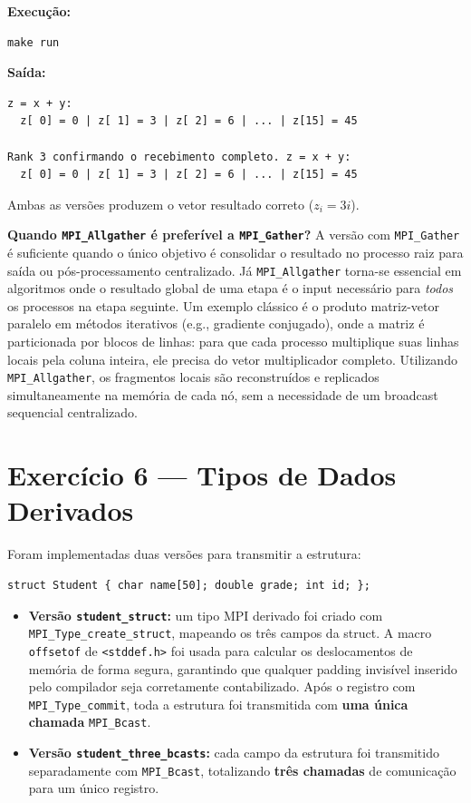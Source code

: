 \documentclass[12pt,a4paper]{article}
\begin{document}
\textbf{Execução:}
\begin{lstlisting}[style=shell]
make run
\end{lstlisting}

\textbf{Saída:}
\begin{lstlisting}[style=shell]
z = x + y:
  z[ 0] = 0 | z[ 1] = 3 | z[ 2] = 6 | ... | z[15] = 45

Rank 3 confirmando o recebimento completo. z = x + y:
  z[ 0] = 0 | z[ 1] = 3 | z[ 2] = 6 | ... | z[15] = 45
\end{lstlisting}

Ambas as versões produzem o vetor resultado correto ($z_i = 3i$).

\textbf{Quando \texttt{MPI\_Allgather} é preferível a \texttt{MPI\_Gather}?} A versão com \texttt{MPI\_Gather} é suficiente quando o único objetivo é consolidar o resultado no processo raiz para saída ou pós-processamento centralizado. Já \texttt{MPI\_Allgather} torna-se essencial em algoritmos onde o resultado global de uma etapa é o input necessário para \emph{todos} os processos na etapa seguinte. Um exemplo clássico é o produto matriz-vetor paralelo em métodos iterativos (e.g., gradiente conjugado), onde a matriz é particionada por blocos de linhas: para que cada processo multiplique suas linhas locais pela coluna inteira, ele precisa do vetor multiplicador completo. Utilizando \texttt{MPI\_Allgather}, os fragmentos locais são reconstruídos e replicados simultaneamente na memória de cada nó, sem a necessidade de um broadcast sequencial centralizado.

\section{Exercício 6 — Tipos de Dados Derivados}

Foram implementadas duas versões para transmitir a estrutura:

\begin{lstlisting}[style=ccode]
struct Student { char name[50]; double grade; int id; };
\end{lstlisting}

\begin{itemize}
  \item \textbf{Versão \texttt{student\_struct}:} um tipo MPI derivado foi criado com \texttt{MPI\_Type\_create\_struct}, mapeando os três campos da struct. A macro \texttt{offsetof} de \texttt{<stddef.h>} foi usada para calcular os deslocamentos de memória de forma segura, garantindo que qualquer padding invisível inserido pelo compilador seja corretamente contabilizado. Após o registro com \texttt{MPI\_Type\_commit}, toda a estrutura foi transmitida com \textbf{uma única chamada} \texttt{MPI\_Bcast}.

  \item \textbf{Versão \texttt{student\_three\_bcasts}:} cada campo da estrutura foi transmitido separadamente com \texttt{MPI\_Bcast}, totalizando \textbf{três chamadas} de comunicação para um único registro.
\end{itemize}
\end{document}
